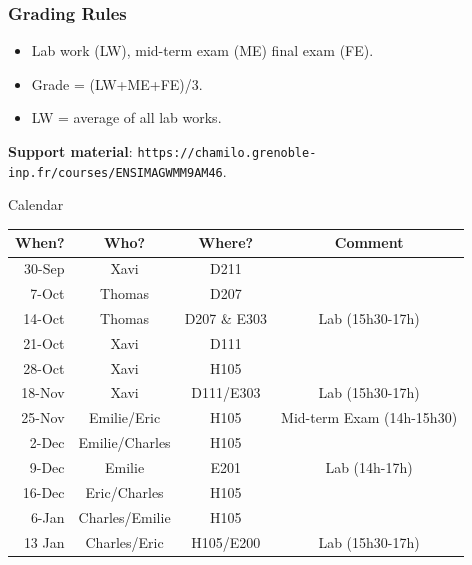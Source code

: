 \documentclass{beamer}
\begin{document}
\begin{frame} \frametitle{Grading Rules}
	\begin{itemize}
		\item Lab work (LW), mid-term exam (ME) final exam (FE).
		\item Grade = (LW+ME+FE)/3.
		\item LW = average of all lab works.
	\end{itemize}
	\vspace{3mm}
	{\bf Support material}: \texttt{https://chamilo.grenoble-inp.fr/courses/ENSIMAGWMM9AM46}.
\end{frame}

\begin{frame}{Calendar}
\centering 
 \begin{tabular}{rccc}
  \toprule
  When? & Who? & Where? & Comment\\
  \midrule
  30-Sep & Xavi & D211 \\
  7-Oct & Thomas & D207 \\
  14-Oct & Thomas & D207 \& E303 & Lab (15h30-17h)\\
  21-Oct & Xavi & D111 \\
  28-Oct & Xavi & H105 \\
  18-Nov & Xavi & D111/E303 & Lab (15h30-17h)\\
  25-Nov & Emilie/Eric & H105 & Mid-term Exam (14h-15h30) \\
  2-Dec & Emilie/Charles & H105\\
  9-Dec & Emilie & E201 & Lab (14h-17h)\\
  16-Dec & Eric/Charles & H105\\
  6-Jan & Charles/Emilie & H105 \\
  13 Jan & Charles/Eric & H105/E200 & Lab (15h30-17h)\\
  \bottomrule
 \end{tabular}
\end{frame}
\end{document}
